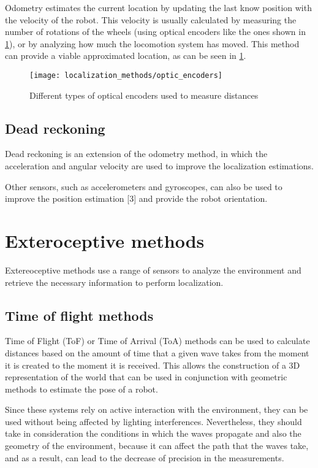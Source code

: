 Odometry estimates the current location by updating the last know position with the velocity of the robot. This velocity is usually calculated by measuring the number of rotations of the wheels (using optical encoders like the ones shown in \cref{fig:localization-methods_optic-encoders}), or by analyzing how much the locomotion system has moved. This method can provide a viable approximated location, as can be seen  in \cref{fig:localization-methods_optic-encoders}.

\begin{figure}[h]
	\centering
	\texttt{[image: localization\_methods/optic\_encoders]}
	\caption{Different types of optical encoders used to measure distances}
	\label{fig:localization-methods_optic-encoders}
\end{figure}


\subsection{Dead reckoning}\textbf{}

Dead reckoning is an extension of the odometry method, in which the acceleration and angular velocity are used to improve the localization estimations.

Other sensors, such as accelerometers and gyroscopes, can also be used to improve the position estimation [3] and provide the robot orientation.



\section{Exteroceptive methods}

Extereoceptive methods use a range of sensors to analyze the environment and retrieve the necessary information to perform localization.


\subsection{Time of flight methods}

Time of Flight (ToF) or Time of Arrival (ToA) methods can be used to calculate distances based on the amount of time that a given wave takes from the moment it is created to the moment it is received. This allows the construction of a 3D representation of the world that can be used in conjunction with geometric methods to estimate the pose of a robot.

Since these systems rely on active interaction with the environment, they can be used without being affected by lighting interferences. Nevertheless, they should take in consideration the conditions in which the waves propagate and also the geometry of the environment, because it can affect the path that the waves take, and as a result, can lead to the decrease of precision in the measurements.

